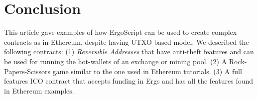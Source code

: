 \documentclass[runningheads]{llncs}
\newcommand{\langname}{ErgoScript\xspace}
\begin{document}

\section{Conclusion}

This article gave examples of how \langname can be used to create complex contracts as in Ethereum, despite having UTXO based model. We described the following contracts: (1) {\em Reversible Addresses} that have anti-theft features and can be used for running the hot-wallets of an exchange or mining pool. (2) A Rock-Papers-Scissors game similar to the one used in Ethereum tutorials. (3) A full features ICO contract that accepts funding in Ergs and has all the features found in Ethereum examples.



\end{document}
